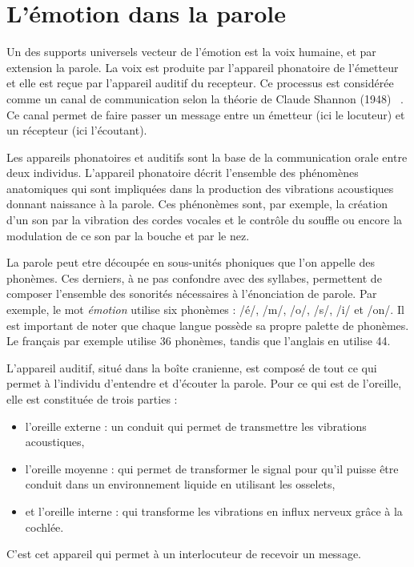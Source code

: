\section{L'émotion dans la parole}
Un des supports universels vecteur de l'émotion est la voix humaine, et par extension la parole.
La voix est produite par l'appareil phonatoire de l'émetteur et elle est reçue par l'appareil auditif du recepteur. Ce processus est considérée comme un canal de communication selon la théorie de Claude Shannon (1948) ~\cite{Shannon1948}. Ce canal permet de faire passer un message entre un émetteur (ici le locuteur) et un récepteur (ici l'écoutant).

Les appareils phonatoires et auditifs sont la base de la communication orale entre deux individus. L'appareil phonatoire décrit l'ensemble des phénomènes anatomiques qui sont impliquées dans la production des vibrations acoustiques donnant naissance à la parole. Ces phénonèmes sont, par exemple, la création d'un son par la vibration des cordes vocales et le contrôle du souffle ou encore la modulation de ce son par la bouche et par le nez.

La parole peut etre découpée en sous-unités phoniques que l'on appelle des phonèmes. Ces derniers, à ne pas confondre avec des syllabes, permettent de composer l'ensemble des sonorités nécessaires à l'énonciation de parole.
Par exemple, le mot \textit{émotion} utilise six phonèmes : /é/, /m/, /o/, /s/, /i/ et /on/.
Il est important de noter que chaque langue possède sa propre palette de phonèmes. Le français par exemple utilise 36 phonèmes, tandis que l'anglais en utilise 44.

L'appareil auditif, situé dans la boîte cranienne, est composé de tout ce qui permet à l'individu d'entendre et d'écouter la parole. Pour ce qui est de l'oreille, elle est constituée de trois parties :
\begin{itemize}
  \item l'oreille externe : un conduit qui permet de transmettre les vibrations acoustiques,
  \item l'oreille moyenne : qui permet de transformer le signal pour qu'il puisse être conduit dans un environnement liquide en utilisant les osselets,
  \item et l'oreille interne : qui transforme les vibrations en influx nerveux grâce à la cochlée.
\end{itemize}
C'est cet appareil qui permet à un interlocuteur de recevoir un message.

